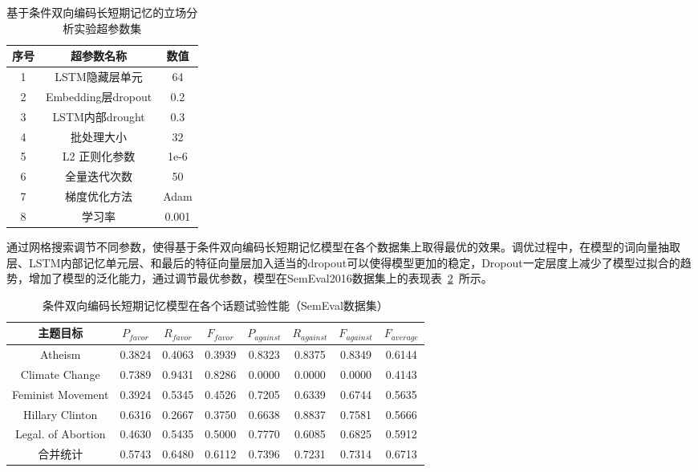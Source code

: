 \begin{table}[htbp]
	\caption[param]{基于条件双向编码长短期记忆的立场分析实验超参数集}
	\label{param}
	\vspace{0.5em}\centering\wuhao
	\begin{tabular}{ccc}
		\toprule[1.5pt]
		序号& 超参数名称 &数值\\
		\midrule[1pt]
		1 &LSTM隐藏层单元& 64\\
		2 &Embedding层dropout& 0.2\\
		3 &LSTM内部drought& 0.3\\
		4 &批处理大小& 32\\
		5 &L2 正则化参数 &1e-6\\
		6 &全量迭代次数& 50\\
		7 &梯度优化方法& Adam\\
		8 &学习率& 0.001\\
		\bottomrule[1.5pt]
	\end{tabular}
\end{table}
通过网格搜索调节不同参数，使得基于条件双向编码长短期记忆模型在各个数据集上取得最优的效果。调优过程中，在模型的词向量抽取层、LSTM内部记忆单元层、和最后的特征向量层加入适当的dropout可以使得模型更加的稳定，Dropout一定层度上减少了模型过拟合的趋势，增加了模型的泛化能力，通过调节最优参数，模型在SemEval2016数据集上的表现表~\ref{conditional_semeval}~所示。
\begin{table}[htbp]
	\caption[table123]{条件双向编码长短期记忆模型在各个话题试验性能（SemEval数据集）}
	\label{conditional_semeval}
	\vspace{0.5em}\centering\wuhao
	\begin{tabular}{cccccccc}
		\toprule[1.5pt]
		主题目标& $P_{favor}$&$R_{favor}$&$F_{favor}$&$P_{against}$&$R_{against}$&$F_{against}$&$F_{average}$ \\
		\midrule[1pt]
		Atheism&0.3824&0.4063&0.3939&0.8323&0.8375&0.8349&0.6144\\
		Climate Change&0.7389&0.9431&0.8286&0.0000&0.0000&0.0000&0.4143\\
		Feminist Movement&0.3924&0.5345&0.4526&0.7205&0.6339&0.6744&0.5635\\
		Hillary Clinton&0.6316&0.2667&0.3750&0.6638&0.8837&0.7581&0.5666\\
		Legal. of Abortion&0.4630&0.5435&0.5000&0.7770&0.6085&0.6825&0.5912\\
		合并统计&0.5743&0.6480&0.6112&0.7396&0.7231&0.7314&0.6713\\
		\bottomrule[1.5pt]
	\end{tabular}
\end{table}

